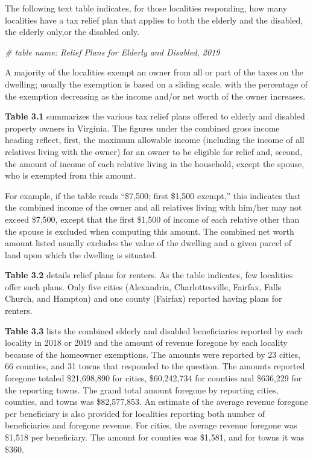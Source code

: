 \documentclass[
]{book}
\newenvironment{Shaded}{\begin{snugshade}}{\end{snugshade}}
\newcommand{\CommentTok}[1]{\textcolor[rgb]{0.56,0.35,0.01}{\textit{#1}}}
\begin{document}
The following text table indicates, for those localities responding, how many localities have a tax relief plan that
applies to both the elderly and the disabled, the elderly only,or the disabled only.

\begin{Shaded}
\begin{Highlighting}[]
\CommentTok{\# table name: Relief Plans for Elderly and Disabled, 2019}
\end{Highlighting}
\end{Shaded}

A majority of the localities exempt an owner from all or part of the taxes on the dwelling; usually the exemption is based on a sliding scale, with the percentage of the exemption decreasing as the income and/or net worth of the owner increases.

\textbf{Table 3.1} summarizes the various tax relief plans offered to elderly and disabled property owners in Virginia.
The figures under the combined gross income heading reflect, first, the maximum allowable income (including the
income of all relatives living with the owner) for an owner to be eligible for relief and, second, the amount of income
of each relative living in the household, except the spouse, who is exempted from this amount.

For example, if the table reads ``\$7,500; first \$1,500 exempt,'' this indicates that the combined income of the
owner and all relatives living with him/her may not exceed \$7,500, except that the first \$1,500 of income of each relative other than the spouse is excluded when computing this amount. The combined net worth amount listed usually
excludes the value of the dwelling and a given parcel of land upon which the dwelling is situated.

\textbf{Table 3.2} details relief plans for renters. As the table indicates, few localities offer such plans. Only five cities
(Alexandria, Charlottesville, Fairfax, Falls Church, and Hampton) and one county (Fairfax) reported having plans
for renters.

\textbf{Table 3.3} lists the combined elderly and disabled beneficiaries reported by each locality in 2018 or 2019 and
the amount of revenue foregone by each locality because of the homeowner exemptions. The amounts were reported
by 23 cities, 66 counties, and 31 towns that responded to the question. The amounts reported foregone totaled \$21,698,890
for cities, \$60,242,734 for counties and \$636,229 for the reporting towns. The grand total amount foregone by
reporting cities, counties, and towns was \$82,577,853. An estimate of the average revenue foregone per beneficiary
is also provided for localities reporting both number of beneficiaries and foregone revenue. For cities, the average
revenue foregone was \$1,518 per beneficiary. The amount for counties was \$1,581, and for towns it was \$360.
\end{document}
